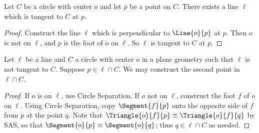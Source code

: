 \documentclass{article}
\begin{document}
\begin{construct}
Let $C$ be a circle with center $o$ and let $p$ be a point on $C$. There exists a line $\ell$ which is tangent to $C$ at $p$.
\end{construct}

\begin{proof}
Construct the line $\ell$ which is perpendicular to $\Line{o}{p}$ at $p$. Then $o$ is not on $\ell$, and $p$ is the foot of $o$ on $\ell$. So $\ell$ is tangent to $C$ at $p$.
\end{proof}

\begin{construct}
Let $\ell$ be a line and $C$ a circle with center $o$ in a plane geometry such that $\ell$ is not tangent to $C$. Suppose $p \in \ell \cap C$. We may construct the second point in $\ell \cap C$.
\end{construct}

\begin{proof}
If $o$ is on $\ell$, use Circle Separation. If $o$ not on $\ell$, construct the foot $f$ of $o$ on $\ell$. Using Circle Separation, copy $\Segment{f}{p}$ onto the opposite side of $f$ from $p$ at the point $q$. Note that $\Triangle{o}{f}{p} \equiv \Triangle{o}{f}{q}$ by SAS, so that $\Segment{o}{p} \equiv \Segment{o}{q}$; thus $q \in \ell \cap C$ as needed.
\end{proof}
\end{document}
